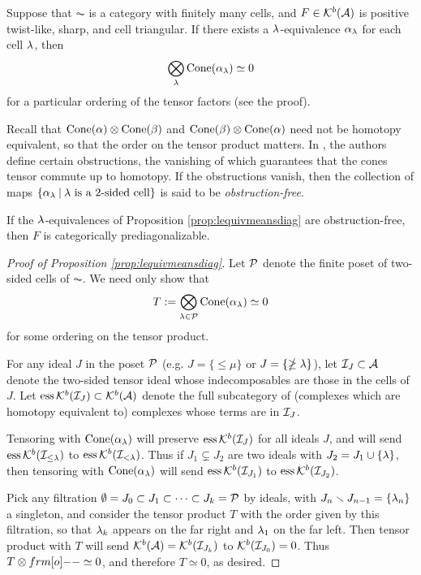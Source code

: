 \begin{prop}\label{prop:lequivmeansdiag} Suppose that $\AC$ is a category with finitely many cells, and $F \in {\mathcal{K}}^b({\mathcal{A}})$ is positive twist-like, sharp, and cell triangular. If there exists a $\lambda$-equivalence $\alpha_\lambda$ for each cell $\lambda$, then
\[
\bigotimes_{\lambda}\operatorname{Cone}(\alpha_\lambda)\simeq 0
\]
for a particular ordering of the tensor factors (see the proof).
\end{prop}


\begin{remark}\label{rmk:obstructions} Recall that $\operatorname{Cone}(\alpha) \otimes \operatorname{Cone}(\beta)$ and $\operatorname{Cone}(\beta) \otimes \operatorname{Cone}(\alpha)$ need not be homotopy equivalent, so that the order on the tensor product matters. In \cite[\S 6.2]{ElHog17a}, the authors define certain obstructions, the vanishing of which guarantees that the cones tensor commute up to homotopy.  If the obstructions vanish, then the collection of maps $\{\alpha_\lambda\:|\: \text{$\lambda$ is a 2-sided cell}\}$ is said to be \emph{obstruction-free}.\end{remark}


\begin{cor} \label{cor:lequivmeansdiag} If the $\lambda$-equivalences of Proposition \ref{prop:lequivmeansdiag} are obstruction-free, then $F$ is categorically prediagonalizable. \end{cor}

\begin{proof}[Proof of Proposition \ref{prop:lequivmeansdiag}] Let ${\mathcal{P}}$ denote the finite poset of two-sided cells of $\AC$.  We need only show that \[ T := \bigotimes_{\lambda \in {\mathcal{P}}} \operatorname{Cone}(\alpha_\lambda) \simeq 0
\] for some ordering on the tensor product.
	
For any ideal $J$ in the poset ${\mathcal{P}}$ (e.g. $J = \{\le \mu\}$ or $J = \{\ngeq \lambda\}$), let ${\mathcal{I}}_J\subset {\mathcal{A}}$ denote the two-sided tensor ideal whose indecomposables are those in the cells
of $J$. Let $\operatorname{ess} {\mathcal{K}}^b({\mathcal{I}}_J)\subset {\mathcal{K}}^b({\mathcal{A}})$ denote the full subcategory of (complexes which are homotopy equivalent to) complexes whose terms are in ${\mathcal{I}}_J$.

Tensoring with $\operatorname{Cone}(\alpha_\lambda)$ will preserve $\operatorname{ess} {\mathcal{K}}^b({\mathcal{I}}_J)$ for all ideals $J$, and will send $\operatorname{ess} {\mathcal{K}}^b({\mathcal{I}}_{\le \lambda})$ to $\operatorname{ess} {\mathcal{K}}^b({\mathcal{I}}_{< \lambda})$. Thus if $J_1 \subsetneq J_2$ are two ideals with $J_2 = J_1 \cup \{\lambda\}$, then tensoring with $\operatorname{Cone}(\alpha_\lambda)$ will send $\operatorname{ess}{\mathcal{K}}^b({\mathcal{I}}_{J_1})$ to $\operatorname{ess}{\mathcal{K}}^b({\mathcal{I}}_{J_2})$.

Pick any filtration $\emptyset = J_0 \subset J_1 \subset \cdots \subset J_k = {\mathcal{P}}$ by ideals, with $J_n \smallsetminus J_{n-1} = \{\lambda_n\}$ a singleton, and consider the tensor product $T$
with the order given by this filtration, so that $\lambda_k$ appears on the far right and $\lambda_1$ on the far left. Then tensor product with $T$ will send ${\mathcal{K}}^b({\mathcal{A}}) = {\mathcal{K}}^b({\mathcal{I}}_{J_k})$ to
${\mathcal{K}}^b({\mathcal{I}}_{J_0}) = 0$. Thus $T \ot \one \simeq 0$, and therefore $T \simeq 0$, as desired. \end{proof}

